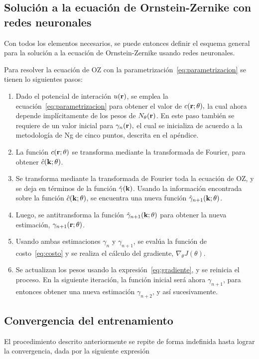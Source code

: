 \subsection{Solución a la ecuación de Ornstein-Zernike con redes neuronales}
Con todos los elementos necesarios, se puede entonces definir el esquema general para
la solución a la ecuación de Ornstein-Zernike usando redes neuronales.

Para resolver la ecuación de OZ con la parametrización~\eqref{eq:parametrizacion} se tienen lo siguientes pasos:

\begin{enumerate}
    \item Dado el potencial de interación $u(\mathbf{r})$, se emplea la ecuación~\eqref{eq:parametrizacion} para obtener el valor de $c(\mathbf{r}; \theta),$ la cual ahora depende implícitamente de los pesos de $N_{\theta}(\mathbf{r})$. En este paso también se requiere de un valor inicial para $\gamma_{n}(\mathbf{r}),$ el cual se inicializa de acuerdo a la metodología de Ng de cinco puntos, descrita en el apéndice. %
    \item La función $c(\mathbf{r}; \theta)$ se transforma mediante la transformada de Fourier, para obtener $\hat{c}(\mathbf{k}; \theta)$.
    \item Se transforma mediante la transformada de Fourier toda la ecuación de OZ, y se deja en términos de la función $\hat{\gamma}(\mathbf{k})$. Usando la información encontrada sobre la función $\hat{c}(\mathbf{k}; \theta)$, se encuentra una nueva función $\hat{\gamma}_{n+1}(\mathbf{k}; \theta)$.
    \item Luego, se antitransforma la función $\hat{\gamma}_{n+1}(\mathbf{k}; \theta)$ para obtener la nueva estimación, $\gamma_{n+1}(\mathbf{r}; \theta)$.
    \item Usando ambas estimaciones $\gamma_{n}$ y $\gamma_{n+1}$, se evalúa la función de costo~\eqref{eq:costo} y se realiza el cálculo del gradiente, $\nabla_{\theta} J(\theta)$.
    \item Se actualizan los pesos usando la expresión~\eqref{eq:gradiente}, y se reinicia el proceso. En la siguiente iteración, la función inicial será ahora $\gamma_{n+1}$, para entonces obtener una nueva estimación $\gamma_{n+2}$, y así sucesivamente.
\end{enumerate}

\subsection{Convergencia del entrenamiento}
El procedimiento descrito anteriormente se repite de forma indefinida hasta lograr la 
convergencia, dada por la siguiente expresión

